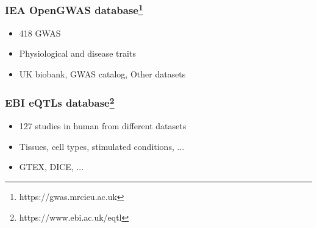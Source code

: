 \documentclass{beamer}
\begin{document}
    \begin{frame}
        \frametitle{IEA OpenGWAS database\footnote{https://gwas.mrcieu.ac.uk}}

        \begin{itemize}
            \item 418 GWAS
            \item Physiological and disease traits
            \item UK biobank, GWAS catalog, Other datasets
        \end{itemize}

    \end{frame}

    \begin{frame}
        \frametitle{EBI eQTLs database\footnote{https://www.ebi.ac.uk/eqtl}}

        \begin{itemize}
            \item 127 studies in human from different datasets
            \item Tissues, cell types, stimulated conditions, ...
            \item GTEX, DICE, ...
        \end{itemize}

    \end{frame}
\end{document}
